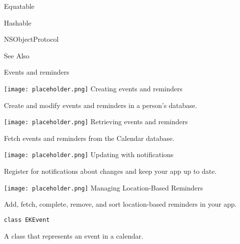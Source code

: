 \documentclass{article}
\begin{document}
Equatable

Hashable

NSObjectProtocol

See Also

Events and reminders

\texttt{[image: placeholder.png]} Creating events and reminders

Create and modify events and reminders in a person's database.

\texttt{[image: placeholder.png]} Retrieving events and reminders

Fetch events and reminders from the Calendar database.

\texttt{[image: placeholder.png]} Updating with notifications

Register for notifications about changes and keep your app up to date.

\texttt{[image: placeholder.png]} Managing Location-Based Reminders

Add, fetch, complete, remove, and sort location-based reminders in your app.

\texttt{class EKEvent}

A class that represents an event in a calendar.

\newpage
\end{document}

